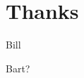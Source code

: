 \documentclass[10pt,]{article} %
\begin{document}
\section{Thanks}


	Bill

	Bart?






\end{document}
